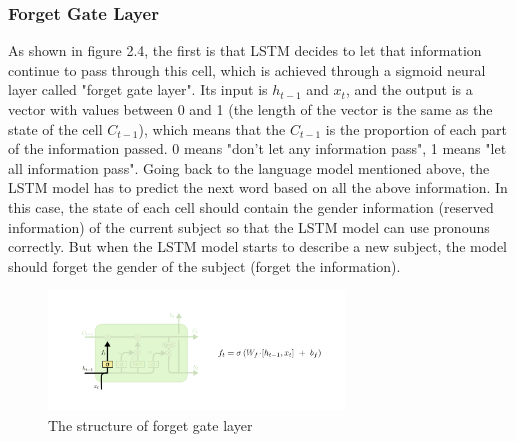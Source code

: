 \subsubsection{Forget Gate Layer}
As shown in figure 2.4, the first is that LSTM decides to let that information continue to pass through this cell, which is achieved through a sigmoid neural layer called "forget gate layer". Its input is $h_{t-1}$ and $x_{t}$, and the output is a vector with values between 0 and 1 (the length of the vector is the same as the state of the cell $C_{t-1}$), which means that the $C_{t-1}$ is the proportion of each part of the information passed. 0 means "don't let any information pass", 1 means "let all information pass". Going back to the language model mentioned above, the LSTM model has to predict the next word based on all the above information. In this case, the state of each cell should contain the gender information (reserved information) of the current subject so that the LSTM model can use pronouns correctly. But when the LSTM model starts to describe a new subject, the model should forget the gender of the subject (forget the information)\cite{LSTM-github}.
\begin{figure}[H]
\centering  %
\includegraphics[width=0.7\textwidth]{forget-gate.png}
\caption{The structure of forget gate layer}
\end{figure}
